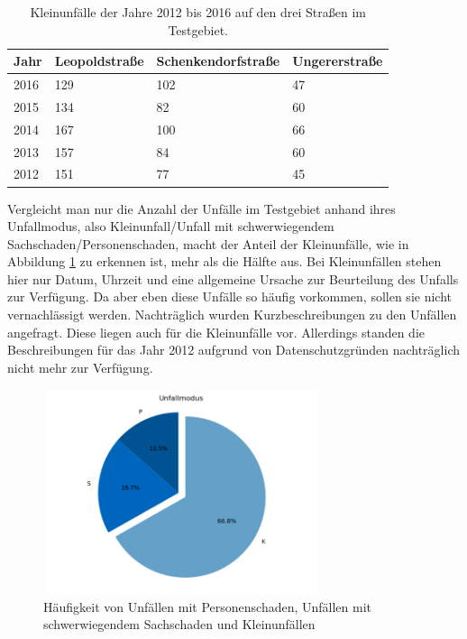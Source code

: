 \begin{table}[htpb]
	\scriptsize
	\caption[Kleinunfälle der Jahre 2012 bis 2016 auf den drei Straßen im Testgebiet]{Kleinunfälle der Jahre 2012 bis 2016 auf den drei Straßen im Testgebiet.}\label{tab:Kleinunfälle}
	\centering
	\begin{tabular}{l  l l p{2cm}}
		\toprule
		Jahr & Leopoldstraße & Schenkendorfstraße & Ungererstraße \\
		\midrule
		2016 & 129 & 102 & 47\\
		2015 & 134 & 82 & 60\\
		2014 & 167 & 100 & 66\\
		2013 & 157 & 84 & 60\\
		2012 & 151 & 77 & 45\\
		\bottomrule
	\end{tabular}
\end{table}

Vergleicht man nur die Anzahl der Unfälle im Testgebiet anhand ihres Unfallmodus, also Kleinunfall/Unfall mit schwerwiegendem Sachschaden/Personenschaden, macht der Anteil der Kleinunfälle, wie in Abbildung \ref{fig:Unfallmodus} zu erkennen ist, mehr als die Hälfte aus. Bei Kleinunfällen stehen hier nur Datum, Uhrzeit und eine allgemeine Ursache zur Beurteilung des Unfalls zur Verfügung. Da aber eben diese Unfälle so häufig vorkommen, sollen sie nicht vernachlässigt werden. Nachträglich wurden Kurzbeschreibungen zu den Unfällen angefragt. Diese liegen auch für die Kleinunfälle vor. Allerdings standen die Beschreibungen für das Jahr 2012 aufgrund von Datenschutzgründen nachträglich nicht mehr zur Verfügung. 

\begin{savenotes}
	\begin{figure}[H]
		\centering
		\includegraphics[width=8.1cm,height=6cm]{figures/Unfallmodus}
		\caption[Häufigkeit des Unfallmoduses]{Häufigkeit von Unfällen mit Personenschaden, Unfällen mit schwerwiegendem Sachschaden und Kleinunfällen}\label{fig:Unfallmodus}
	\end{figure}
\end{savenotes}

